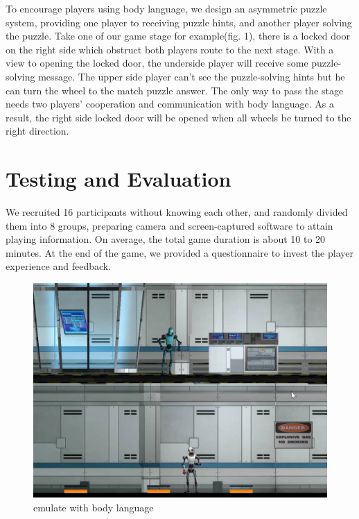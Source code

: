 \documentclass{chi-ext}
\begin{document}
To encourage players using body language, we design an asymmetric puzzle system, providing one player to receiving puzzle hints, and another player solving the puzzle. Take one of our game stage for example(fig. 1), there is a locked door on the right side which obstruct both players route to the next stage. With a view to opening the locked door, the underside player will receive some puzzle-solving message. The upper side player can't see the puzzle-solving hints but he can turn the wheel to the match puzzle answer. The only way to pass the stage needs two players' cooperation and communication with body language. As a result, the right side locked door will be opened when all wheels be turned to the right direction.


\section{Testing and Evaluation}
We recruited 16 participants without knowing each other, and randomly divided them into 8 groups, preparing camera and screen-captured software to attain playing information. 
On average, the total game duration is about 10 to 20 minutes. 
At the end of the game, we provided a questionnaire to invest the player experience and feedback.

\begin{figure}
  \centering
  \includegraphics[width=0.8\linewidth]{figures/Figure2.jpg}
  \caption{emulate with body language}
  \label{fig:Figure2}
\end{figure}
\end{document}
